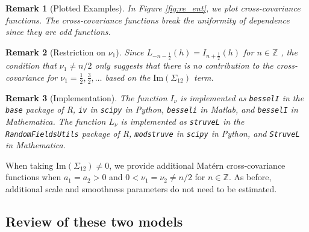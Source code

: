 \documentclass[11pt]{article}
\newtheorem*{remark}{Remark}
\begin{document}
\begin{remark}[Plotted Examples]\normalfont
In Figure \ref{fig:re_ent}, we plot cross-covariance functions. The cross-covariance functions break the uniformity of dependence since they are odd functions. 
\end{remark}

\begin{remark}[Restriction on $\nu_1$]\normalfont
Since $L_{-n - \frac{1}{2}}(h) = I_{n + \frac{1}{2}}(h)$ for $n \in \mathbb{Z}$ \citep[as in 11.4.4 of][]{NIST:DLMF}, the condition that $\nu_1 \neq n/2$ only suggests that there is no contribution to the cross-covariance for $\nu_1 = \frac{1}{2}, \frac{3}{2}, \dots$ based on the $\textrm{Im}(\Sigma_{12})$ term. 
\end{remark}

\begin{remark}[Implementation]\normalfont
The function $I_\nu$ is implemented as \texttt{besselI} in the \texttt{base} package of R, \texttt{iv} in \texttt{scipy} in Python, \texttt{besseli} in Matlab, and \texttt{besselI} in Mathematica. 
The function $L_\nu$ is implemented as \texttt{struveL} in the \texttt{RandomFieldsUtils} package of R, \texttt{modstruve} in \texttt{scipy} in Python, and \texttt{StruveL} in Mathematica. 
\end{remark}

When taking $\textrm{Im}(\Sigma_{12}) \neq 0$, we provide additional Mat\'ern cross-covariance functions when $a_1=a_2 >0$ and $0<\nu_1 = \nu_2 \neq n/2$ for $n \in \mathbb{Z}$. As before, additional scale and smoothness parameters do not need to be estimated. 

\subsection{Review of these two models}
\end{document}
